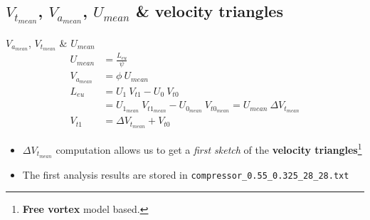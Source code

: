 \subsection{$V_{t_{mean}}$, $V_{a_{mean}}$, $U_{mean}$ \& velocity triangles}
\begin{frame}[fragile]{$V_{a_{mean}}$, $V_{t_{mean}}$ \& $U_{mean}$}
	\begin{align}
		U_{mean} & = \frac{L_{eu}}{\psi} \nonumber \\ 
		V_{a_{mean}} & = \phi \ U_{mean} \nonumber \\
		L_{eu} & = U_1 \ V_{t1} - U_0 \ V_{t0} \nonumber \\ 
		       & = U_{1_{mean}} \ V_{t1_{mean}} - U_{0_{mean}} \ V_{t0_{mean}} = U_{mean} \ \Delta V_{t_{mean}} \nonumber \\
		V_{t1} & = \Delta V_{t_{mean}} + V_{t0} \nonumber  
	\end{align}
	\begin{itemize}
		\item $\Delta V_{t_{mean}}$ computation allows us to get a \textit{first sketch} of the \textbf{velocity triangles}\footnote{\textbf{Free vortex} model based.}
		\item The first analysis results are stored in \verb|compressor_0.55_0.325_28_28.txt|
	\end{itemize}
\end{frame}
